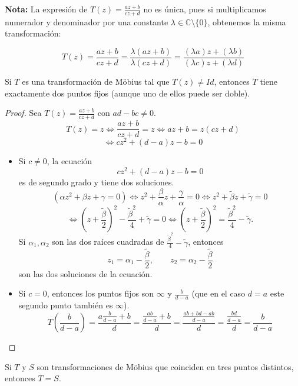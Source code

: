 \textbf{Nota:} La expresión de $T(z) = \frac{az + b}{cz + d}$ no es única, pues si multiplicamos numerador y denominador por una constante $\lambda \in \mathbb{C} \setminus \{0\}$, obtenemos la misma transformación:

\[
    T(z) = \frac{az + b}{cz + d} = \frac{\lambda(az + b)}{\lambda(cz + d)} = \frac{(\lambda a)z + (\lambda b)}{(\lambda c)z + (\lambda d)}
\]

\begin{proposición}
    Si $T$ es una transformación de Möbius tal que $T(z) \neq Id$, entonces $T$ tiene exactamente dos puntos fijos (aunque uno de ellos puede ser doble).
\end{proposición}

\begin{proof}
    Sea $T(z) = \frac{az + b}{cz + d}$ con $ad - bc \neq 0$. 
    \[
    T(z) = z \iff \frac{az + b}{cz + d} = z \iff az + b = z(cz + d) 
    \]
    \[
    \iff cz^2 + (d - a)z - b = 0
    \]
    \begin{itemize}
        \item Si $c \neq 0$, la ecuación 
        \[
            cz^2 + (d - a)z - b = 0
        \]
        es de segundo grado y tiene dos soluciones.
        \[
            (\alpha z^2 + \beta z + \gamma = 0) 
            \iff z^2 + \frac{\beta}{\alpha}z + \frac{\gamma}{\alpha} = 0 
            \iff z^2 + \tilde{\beta} z + \tilde{\gamma} = 0 
        \]
        \[
            \iff \left(z + \frac{\tilde{\beta}}{2}\right)^2 - \frac{\tilde{\beta}^2}{4} + \tilde{\gamma} = 0 
            \iff \left(z + \frac{\tilde{\beta}}{2}\right)^2 = \frac{\tilde{\beta}^2}{4} - \tilde{\gamma}.
        \]        
        Si $\alpha_1, \alpha_2$ son las dos raíces cuadradas de $\tfrac{\tilde{\beta}^2}{4} - \tilde{\gamma}$, entonces 
        \[
            z_1 = \alpha_1 - \frac{\tilde{\beta}}{2}, 
            \qquad 
            z_2 = \alpha_2 - \frac{\tilde{\beta}}{2}
        \]
        son las dos soluciones de la ecuación.        
        \item Si $c = 0$, entonces los puntos fijos son $\infty$ y $\frac{b}{d-a}$ (que en el caso $d=a$ este segundo punto también es $\infty$).
        \[
            T\left(\frac{b}{d-a}\right) = \frac{a\frac{b}{d-a} + b}{d} = \frac{\frac{ab}{d-a} + b}{d} = \frac{\frac{ab + bd - ab}{d-a}}{d} = \frac{\frac{bd}{d-a}}{d} = \frac{b}{d-a}
        \]
    \end{itemize}
\end{proof}

\begin{corolario}
    Si $T$ y $S$ son transformaciones de Möbius que coinciden en tres puntos distintos, entonces $T = S$.
\end{corolario}

